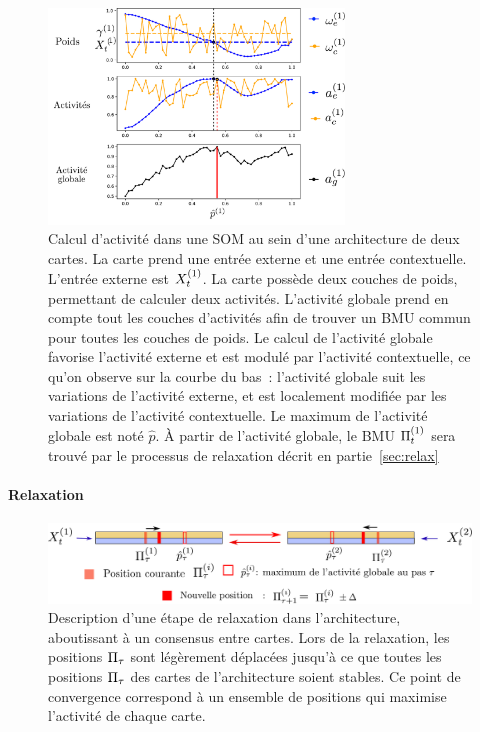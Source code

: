 \documentclass[../main]{subfiles}
\begin{document}
\begin{figure}
    \centering
    \includegraphics[width=0.7\textwidth]{activite_layers_2maps.pdf}
    \caption{Calcul d'activité dans une SOM au sein d'une architecture de deux cartes. La carte prend une entrée externe et une entrée contextuelle. 
    L'entrée externe est $X^{({1})}_t$. La carte possède deux couches de poids, permettant de calculer deux activités. L'activité globale prend en compte tout les couches d'activités afin de trouver un BMU commun pour toutes les couches de poids. Le calcul de l'activité globale favorise l'activité externe et est modulé par l'activité contextuelle, ce qu'on observe sur la courbe du bas~: l'activité globale suit les variations de l'activité externe, et est localement modifiée par les variations de l'activité contextuelle.
    Le maximum de l'activité globale est noté $\hat{p}$. \`A partir de l'activité globale, le BMU $\Pi^{({1})}_t$ sera trouvé par le processus de relaxation décrit en partie~\ref{sec:relax}\label{fig:2som_activite}}
    \end{figure}

\paragraph{Relaxation}
\begin{figure}
    \centering
    \includegraphics[width=\textwidth]{relaxation_2maps.pdf}
    \caption{Description d'une étape de relaxation dans l'architecture, aboutissant à un consensus entre cartes. Lors de la relaxation, les positions $\Pi_\tau$ sont légèrement déplacées jusqu'à ce que toutes les positions $\Pi_\tau$ des cartes de l'architecture soient stables. Ce point de convergence correspond à un ensemble de positions qui maximise l'activité de chaque carte. \label{fig:relax}}
    \end{figure}
\end{document}
